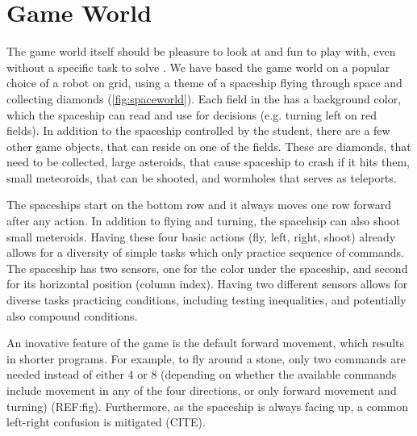 

\section{Game World}  %
\label{sec:robomission.game-world}

The game world itself should be pleasure to look at and fun to play with,
even without a specific task to solve \cite{book-of-lenses}.
We have based the game world on a popular choice of a robot on grid,
using a theme of a spaceship flying through space and collecting diamonds
(\cref{fig:spaceworld}).
Each field in the  has a background color, which
the spaceship can read and use for decisions (e.g. turning left on red fields).
In addition to the spaceship controlled by the student,
there are a few other game objects, that can reside on one of the fields.
These are diamonds, that need to be collected,
large asteroids, that cause spaceship to crash if it hits them,
small meteoroids, that can be shooted,
and wormholes that serves as teleports.

The spaceships start on the bottom row and it always moves one row forward
after any action. %
In addition to flying and turning, the spacehsip can also shoot small meteroids.
Having these four basic actions (fly, left, right, shoot) already allows for a
diversity of simple tasks which only practice sequence of commands.
The spaceship has two sensors, one for the color under the spaceship, and
second for its horizontal position (column index). Having two different sensors allows
for diverse tasks practicing conditions, including testing inequalities, and
potentially also compound conditions.

An inovative feature of the game is the default forward movement,
which results in shorter programs.
For example, to fly around a stone, only two commands are needed %
instead of either 4 or 8 (depending on whether the available commands include
movement in any of the four directions, or only forward movement and turning)
(REF:fig).
Furthermore, as the spaceship is always facing up, a common left-right
confusion is mitigated (CITE).

